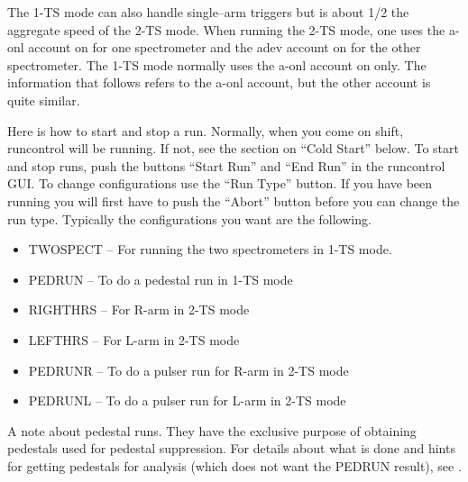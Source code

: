 {\par
The 1-TS mode can also handle single--arm
triggers but is about 1/2 the aggregate speed
of the 2-TS mode.  When running the 2-TS
mode, one uses the a-onl account on  for one
spectrometer and the adev account on  
for the other spectrometer.  
The 1-TS mode normally uses the 
a-onl account on  only.
The information that follows refers to 
the a-onl account, but the other account is quite similar.

\par
Here is how to start and stop a run.
Normally, when you come on shift, 
runcontrol will be running.  If not,
see the section on ``Cold Start'' below.
To start and stop runs, push the buttons
``Start Run'' and ``End Run'' in the
runcontrol GUI.   To change configurations
use the ``Run Type'' button.  If you have
been running you will first have to push the
``Abort'' button before you can change the 
run type. Typically the configurations
you want are the following.

\begin{itemize} 
\item[~]TWOSPECT -- For running the two spectrometers in
1-TS mode.
\item[~]PEDRUN -- To do a pedestal run in 1-TS mode
\item[~]RIGHTHRS -- For R-arm in 2-TS mode
\item[~]LEFTHRS -- For L-arm in 2-TS mode
\item[~]PEDRUNR -- To do a pulser run for R-arm in 2-TS mode
\item[~]PEDRUNL -- To do a pulser run for L-arm in 2-TS mode
\end{itemize} 

\par 
A note about pedestal runs.  They have the exclusive
purpose of obtaining pedestals used for pedestal
suppression.  For details about what is done
and hints for getting pedestals for analysis (which
does not want the PEDRUN result), see .

}

